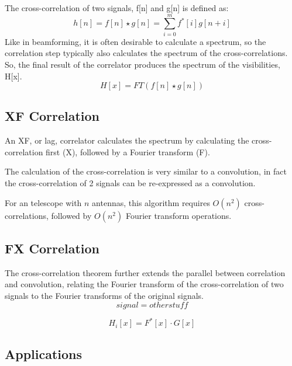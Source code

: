 The cross-correlation of two signals, f[n] and g[n] is defined as:
\[h[n] = f[n]\star g[n] = \sum_{i=0}^m f^*[i]g[n+i]\]
Like in beamforming, it is often desirable to calculate a spectrum, so the correlation step typically also calculates the spectrum of the cross-correlations. 
So, the final result of the correlator produces the spectrum of the visibilities, H[x].
\[H[x] = FT(f[n]\star g[n])\]


\subsection{XF Correlation}
An XF, or lag, correlator calculates the spectrum by calculating the cross-correlation first (X), followed by a Fourier transform (F).

The calculation of the cross-correlation is very similar to a convolution, in fact the cross-correlation of 2 signals can be re-expressed as a convolution. 
\[\]
\[\]

For an telescope with $n$ antennas, this algorithm requires $O(n^2)$ cross-correlations, followed by $O(n^2)$ Fourier transform operations.
 


\subsection{FX Correlation}
The cross-correlation theorem further extends the parallel between correlation and convolution, relating the Fourier transform of the cross-correlation of two signals to the Fourier transforms of the original signals. 
\[ signal = other stuff\]

\[H_i[x] = F^*[x] \cdot G[x]\]

\subsection{Applications}



%

